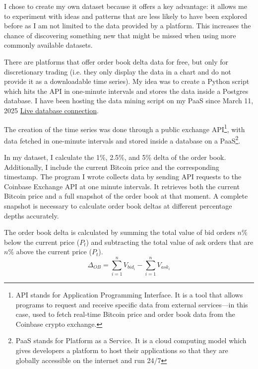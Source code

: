\documentclass[12pt]{article}
\begin{document}
I chose to create my own dataset because it offers a key advantage: it allows me to experiment with ideas and patterns that are less likely to have been explored before as I am not limited to the data provided by a platform. 
This increases the chance of discovering something new that might be missed when using more commonly available datasets.

There are platforms that offer order book delta data for free, but only for discretionary trading (i.e. they only display the data in a chart and do not provide it as a downloadable time series). My idea was to create a Python script which hits the API in one-minute intervals and stores the data inside a Postgres database. I have been hosting the data mining script on my PaaS since March 11, 2025 \href{https://customchart-production.up.railway.app/#}{Live database connection}.

The creation of the time series was done through a public exchange API\footnote[1]{API stands for Application Programming Interface. It is a tool that allows programs to request and receive specific data from external services—in this case, used to fetch real-time Bitcoin price and order book data from the Coinbase crypto exchange.}, with data fetched in one-minute intervals and stored inside a database on a PaaS\footnote[2]{PaaS stands for Platform as a Service. It is a cloud computing model which gives developers a platform to host their applications so that they are globally accessible on the internet and run 24/7}.


In my dataset, I calculate the 1\%, 2.5\%, and 5\% delta of the order book. Additionally, I include the current Bitcoin price and the corresponding timestamp. The program I wrote collects data by sending API requests to the Coinbase Exchange API at one minute intervals. It retrieves both the current Bitcoin price and a full snapshot of the order book at that moment. A complete snapshot is necessary to calculate order book deltas at different percentage depths accurately.


\newpage
The order book delta is calculated by summing the total value of bid orders $n\%$ below the current price ($P_t$) and subtracting the total value of ask orders that are $n\%$ above the current price ($P_t$).
\begin{equation*}
    \Delta_{OB} = \sum_{i=1}^{n} V_{bid_i} - \sum_{i=1}^{n} V_{ask_i}
\end{equation*}


\end{document}
